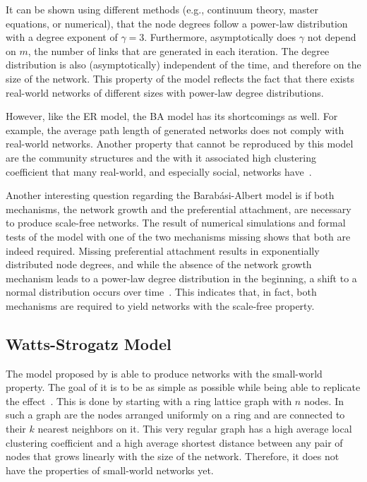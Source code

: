 It can be shown using different methods (e.g., continuum theory, master equations, or numerical), that the node degrees follow a power-law distribution with a degree exponent of \( \gamma = 3 \).
Furthermore, asymptotically does \( \gamma \) not depend on \( m \), the number of links that are generated in each iteration.
The degree distribution is also (asymptotically) independent of the time, and therefore on the size of the network.
This property of the model reflects the fact that there exists real-world networks of different sizes with power-law degree distributions.

However, like the ER model, the BA model has its shortcomings as well.
For example, the average path length of generated networks does not comply with real-world networks.
Another property that cannot be reproduced by this model are the community structures and the with it associated high clustering coefficient that many real-world, and especially social, networks have~\cite{Reid2011}.

Another interesting question regarding the Barabási-Albert model is if both mechanisms, the network growth and the preferential attachment, are necessary to produce scale-free networks.
The result of numerical simulations and formal tests of the model with one of the two mechanisms missing shows that both are indeed required.
Missing preferential attachment results in exponentially distributed node degrees, and while the absence of the network growth mechanism leads to a power-law degree distribution in the beginning, a shift to a normal distribution occurs over time~\cite{Barabasi2002}.
This indicates that, in fact, both mechanisms are required to yield networks with the scale-free property.


\subsection{Watts-Strogatz Model}
\label{subsec:watts-strogatz-model}

The model proposed by \citet{Watts1998} is able to produce networks with the small-world property.
The goal of it is to be as simple as possible while being able to replicate the effect~\cite{Watts2004}.
This is done by starting with a ring lattice graph with \( n \) nodes.
In such a graph are the nodes arranged uniformly on a ring and are connected to their \( k \) nearest neighbors on it.
This very regular graph has a high average local clustering coefficient and a high average shortest distance between any pair of nodes that grows linearly with the size of the network.
Therefore, it does not have the properties of small-world networks yet.

